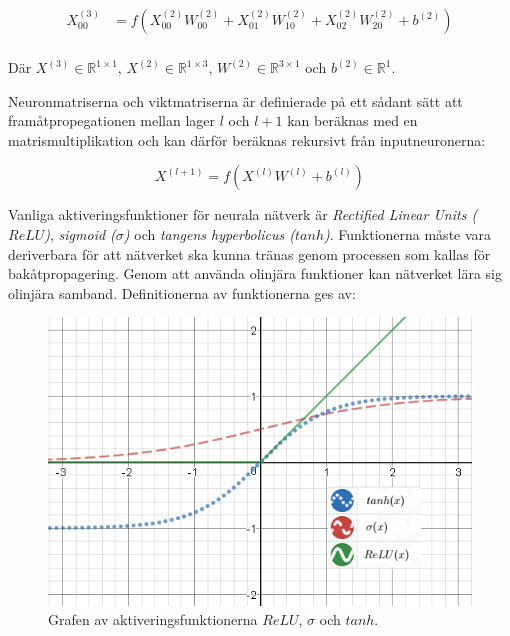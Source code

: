 \documentclass[a4paper,11pt,twoside]{article}
\begin{document}
\begin{equation}
\begin{split}
X_{00}^{(3)} & = f(X_{00}^{(2)}W_{00}^{(2)} + X_{01}^{(2)}W_{10}^{(2)} + X_{02}^{(2)}W_{20}^{(2)} + b^{(2)}) \\
\end{split}
\end{equation}

Där $X^{(3)} \in \mathbb{R}^{1 \times 1}$, $X^{(2)} \in \mathbb{R}^{1 \times 3}$, $W^{(2)} \in \mathbb{R}^{3 \times 1}$ och $b^{(2)} \in \mathbb{R}^{1}$.

Neuronmatriserna och viktmatriserna är definierade på ett sådant sätt att framåtpropegationen mellan lager $l$ och $l+1$ kan beräknas med en matrismultiplikation och kan därför beräknas rekursivt från inputneuronerna: \cite{cs231n} \cite{wikiStanford}

\begin{equation}\label{feed-forward}
X^{(l+1)} = f(X^{(l)}W^{(l)} +b^{(l)})
\end{equation}

Vanliga aktiveringsfunktioner för neurala nätverk är \textit{Rectified Linear Units ($ReLU$)}, \textit{sigmoid ($\sigma$)} och \textit{tangens hyperbolicus ($tanh$)}. Funktionerna måste vara deriverbara för att nätverket ska kunna tränas genom processen som kallas för bakåtpropagering. Genom att använda olinjära funktioner kan nätverket lära sig olinjära samband. Definitionerna av funktionerna ges av: \cite{cs231n} 

\begin{figure}[h]\label{aktiveringsfunktion}
	\centering
  		\includegraphics[scale=0.8]{activationfunction.png}
  	\caption{Grafen av aktiveringsfunktionerna $ReLU$, $\sigma$ och $tanh$.}
\end{figure}
\end{document}
